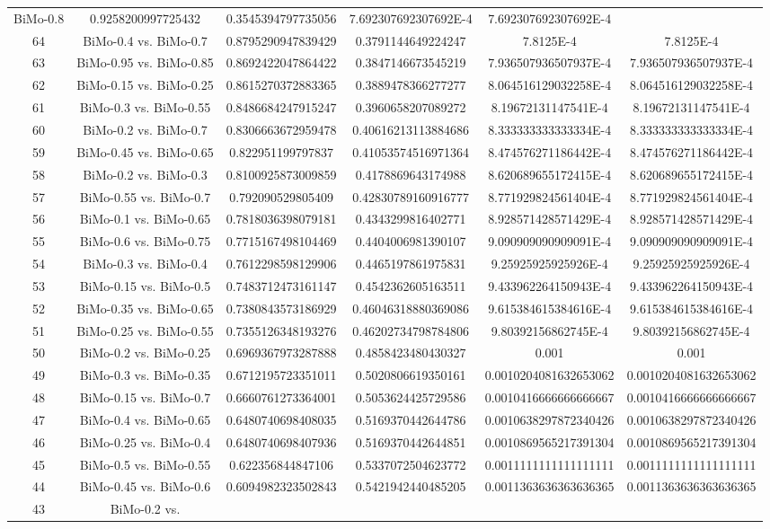 \documentclass[a4paper,10pt]{article}
\begin{document}
\begin{landscape}
\begin{table}[!htp]
\begin{tabular}{cccccc}
BiMo-0.8&0.9258200997725432&0.3545394797735056&7.692307692307692E-4&7.692307692307692E-4\\64&BiMo-0.4 vs. BiMo-0.7&0.8795290947839429&0.3791144649224247&7.8125E-4&7.8125E-4\\63&BiMo-0.95 vs. BiMo-0.85&0.8692422047864422&0.3847146673545219&7.936507936507937E-4&7.936507936507937E-4\\62&BiMo-0.15 vs. BiMo-0.25&0.8615270372883365&0.3889478366277277&8.064516129032258E-4&8.064516129032258E-4\\61&BiMo-0.3 vs. BiMo-0.55&0.8486684247915247&0.3960658207089272&8.19672131147541E-4&8.19672131147541E-4\\60&BiMo-0.2 vs. BiMo-0.7&0.8306663672959478&0.40616213113884686&8.333333333333334E-4&8.333333333333334E-4\\59&BiMo-0.45 vs. BiMo-0.65&0.822951199797837&0.41053574516971364&8.474576271186442E-4&8.474576271186442E-4\\58&BiMo-0.2 vs. BiMo-0.3&0.8100925873009859&0.4178869643174988&8.620689655172415E-4&8.620689655172415E-4\\57&BiMo-0.55 vs. BiMo-0.7&0.792090529805409&0.42830789160916777&8.771929824561404E-4&8.771929824561404E-4\\56&BiMo-0.1 vs. BiMo-0.65&0.7818036398079181&0.4343299816402771&8.928571428571429E-4&8.928571428571429E-4\\55&BiMo-0.6 vs. BiMo-0.75&0.7715167498104469&0.4404006981390107&9.090909090909091E-4&9.090909090909091E-4\\54&BiMo-0.3 vs. BiMo-0.4&0.7612298598129906&0.4465197861975831&9.25925925925926E-4&9.25925925925926E-4\\53&BiMo-0.15 vs. BiMo-0.5&0.7483712473161147&0.4542362605163511&9.433962264150943E-4&9.433962264150943E-4\\52&BiMo-0.35 vs. BiMo-0.65&0.7380843573186929&0.46046318880369086&9.615384615384616E-4&9.615384615384616E-4\\51&BiMo-0.25 vs. BiMo-0.55&0.7355126348193276&0.46202734798784806&9.80392156862745E-4&9.80392156862745E-4\\50&BiMo-0.2 vs. BiMo-0.25&0.6969367973287888&0.4858423480430327&0.001&0.001\\49&BiMo-0.3 vs. BiMo-0.35&0.6712195723351011&0.5020806619350161&0.0010204081632653062&0.0010204081632653062\\48&BiMo-0.15 vs. BiMo-0.7&0.6660761273364001&0.5053624425729586&0.0010416666666666667&0.0010416666666666667\\47&BiMo-0.4 vs. BiMo-0.65&0.6480740698408035&0.5169370442644786&0.0010638297872340426&0.0010638297872340426\\46&BiMo-0.25 vs. BiMo-0.4&0.6480740698407936&0.5169370442644851&0.0010869565217391304&0.0010869565217391304\\45&BiMo-0.5 vs. BiMo-0.55&0.622356844847106&0.5337072504623772&0.0011111111111111111&0.0011111111111111111\\44&BiMo-0.45 vs. BiMo-0.6&0.6094982323502843&0.5421942440485205&0.0011363636363636365&0.0011363636363636365\\43&BiMo-0.2 vs. 
\end{tabular}
\end{table}
\end{landscape}
\end{document}
